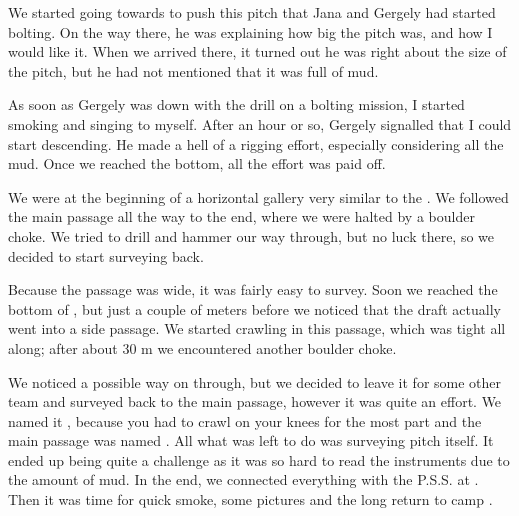 
    


We started going towards  to push this pitch
that Jana and Gergely had started bolting. On the way there, he was
explaining how big the pitch was, and how I would like it. When we
arrived there, it turned out he was right about the size of the pitch,
but he had not mentioned that it was full of mud.

As soon as Gergely was down with the drill on a bolting mission, I
started smoking and singing to myself. After an hour or so, Gergely
signalled that I could start descending. He made a hell of a rigging
effort, especially considering all the mud. Once we reached the bottom,
all the effort was paid off.

We were at the beginning of a horizontal gallery very similar to the
. We followed the main passage all the way to
the end, where we were halted by a boulder choke. We tried to drill and
hammer our way through, but no luck there, so we decided to start
surveying back.

Because the passage was wide, it was fairly easy to survey. Soon we
reached the bottom of , but just a couple of
meters before we noticed that the draft actually went into a side
passage. We started crawling in this passage, which was tight all along;
after about 30 m we encountered another boulder choke.


We noticed a possible way on through, but we decided to leave it for
some other team and surveyed back to the main passage, however it was
quite an effort. We named it , because you had to crawl
on your knees for the most part and the main passage was named
. All what was left to do was surveying  pitch itself. It ended up being quite a challenge as it was so
hard to read the instruments due to the amount of mud. In the end, we
connected everything with the P.S.S. at . Then it was
time for quick smoke, some pictures and the long return to camp
.

